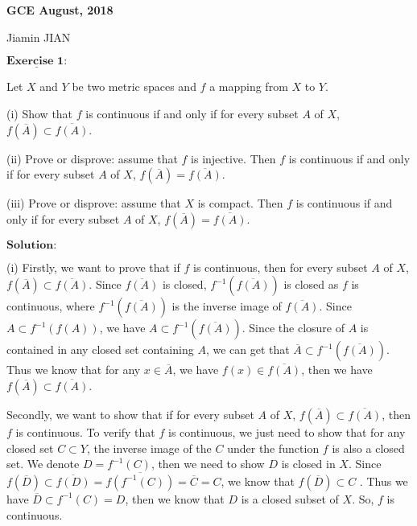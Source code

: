 \documentclass[12pt,a4paper]{ctexart}
\begin{document}
\begin{center}
\textbf{ GCE August, 2018}
\vspace{8pt}

Jiamin JIAN
\end{center}

\vspace{12pt}

$\underline{\textbf{Exercise 1:}}$

Let $X$ and $Y$ be two metric spaces and $f$ a mapping from $X$ to $Y$.

(i) Show that $f$ is continuous if and only if for every subset $A$ of $X$, $f(\overline{A}) \subset  \overline{f(A)}$.

(ii) Prove or disprove: assume that $f$ is injective. Then $f$ is continuous if and only if for every subset $A$ of $X$, $f(\overline{A}) = \overline{f(A)}$. 

(iii) Prove or disprove: assume that $X$ is compact. Then $f$ is continuous if and only if for every subset $A$ of $X$, $f(\overline{A}) = \overline{f(A)}$. 

\vspace{8pt}

$\textbf{Solution:}$

(i) Firstly, we want to prove that if $f$ is continuous, then for every subset $A$ of $X$, $f(\overline{A}) \subset  \overline{f(A)}$. Since $\overline{f(A)}$ is closed, $f^{-1}(\overline{f(A)})$ is closed as $f$ is continuous, where $f^{-1}(\overline{f(A)})$ is the inverse image of $\overline{f(A)}$. Since $A \subset f^{-1} (f(A))$, we have $A \subset f^{-1}( \overline{f(A)})$. Since the closure of $A$ is contained in any closed set containing $A$, we can get that $\overline{A} \subset f^{-1} (\overline{f(A)})$. Thus we know that for any $x \in \overline{A}$, we have $f(x) \in \overline{f(A)}$, then we have $f(\overline{A}) \subset  \overline{f(A)}$.

Secondly, we want to show that if for every subset $A$ of $X$, $f(\overline{A}) \subset  \overline{f(A)}$, then $f$ is continuous. To verify that $f$ is continuous, we just need to show that for any closed set $C \subset Y$, the inverse image of the $C$ under the function $f$ is also a closed set. We denote $D = f^{-1}(C)$, then we need to show $D$ is closed in $X$. Since $f(\overline{D}) \subset \overline{f(D)} = \overline{f(f^{-1}(C))} = \overline{C} = C$, we know that $f(\overline{D}) \subset C$
. Thus we have $\overline{D} \subset f^{-1}(C) = D$, then we know that $D$ is a closed subset of $X$. So, $f$ is continuous.
\end{document}
